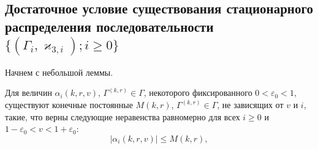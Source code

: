 \documentclass[a4paper,12pt,russian]{extarticle}
\newcommand{\MarkThree}{\{(\Gamma_i, \varkappa_{3,i}); i \geqslant 0\}}
\begin{document}
\subsection{Достаточное условие существования стационарного распределения последовательности $\MarkThree$ }
Начнем с небольшой леммы.
\begin{lemma}
Для величин $\alpha_i(k,r,v)$, $\Gamma^{(k,r)} \in \Gamma$, некоторого фиксированного $0 < \varepsilon_0 < 1$, существуют конечные постоянные $M(k,r)$, $\Gamma^{(k,r)}\in \Gamma$, не зависящих от $v$ и $i$, такие, что верны следующие неравенства равномерно для всех $i \geqslant 0$ и $ 1-\varepsilon_0 < v < 1  + \varepsilon_0$:
\begin{equation}
|\alpha_i(k,r,v)| \leqslant M(k,r),
\end{equation}

\end{lemma}
\end{document}
